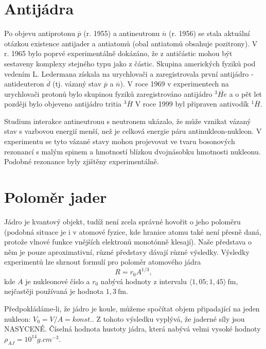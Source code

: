 \documentclass[../../main.tex]{subfiles}
\begin{document}
\section{Antijádra}

Po objevu antiprotonu $\overline{p}$ (r. 1955) a antineutronu $\overline{n}$ (r. 1956) se stala aktuální otázkou existence antijader a antiatomů (obal antiatomů obsahuje pozitrony). V r. 1965 bylo poprvé experimentálně dokázáno, že z antičástic mohou být sestaveny komplexy stejného typu jako z částic. Skupina amerických fyziků pod vedením L. Ledermana získala na urychlovači a zaregistrovala první antijádro - antideuteron $\overline{d}$ (tj. vázaný stav $\overline{p}$ a $\overline{n}$). V roce 1969 v experimentech na urychlovači protonů bylo skupinou fyziků zaregistrováno antijádro $^{3} \overline{He}$ a o pět let později bylo objeveno antijádro tritia $^{3} \overline{H}$ V roce 1999 byl připraven antivodík $^{1} \overline{H}$.

Studium interakce antineutronu s neutronem ukázalo, že může vznikat vázaný stav s vazbovou energií menší, než je celková energie páru antinukleon-nukleon. V experimentu se tyto vázané stavy mohou projevovat ve tvaru bosonových rezonancí s malým spinem a hmotností blízkou dvojnásobku hmotnosti nukleonu. Podobné rezonance byly zjištěny experimentálně.

\section{Poloměr jader}

Jádro je kvantový objekt, tudíž není zcela správné hovořit o jeho poloměru (podobná situace je i v atomové fyzice, kde hranice atomu také není přesně daná, protože vlnové funkce vnějších elektronů monotónně klesají). Naše představa o něm je pouze aproximativní, různé představy dávají různé výsledky. Výsledky experimentů lze shrnout formulí pro poloměr atomového jádra
\begin{equation}
R = r_0 A ^{1/3},
\end{equation}
kde $A$ je nukleonové číslo a $r_0$ nabývá hodnoty z intervalu $\langle1,05; 1,45\rangle ~\mathrm{fm}$, nejčastěji používaná je hodnota $1,3 ~\mathrm{fm}$.

Předpokládáme-li, že jádro je koule, můžeme spočítat objem připadající na jeden nukleon: $V_0 = V/A = konst.$. Z tohoto výsledku vyplývá, že jaderné síly jsou NASYCENÉ. Číselná hodnota hustoty jádra, která nabývá velmi vysoké hodnoty $\rho _{AJ} = 10^{14} g.cm^{-3}$.
\end{document}
